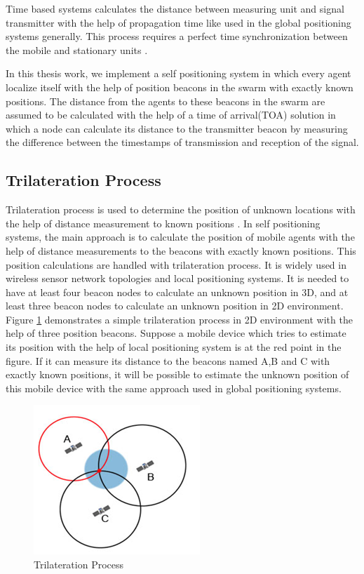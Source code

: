 Time based systems calculates the distance between measuring unit and signal transmitter with the help of propagation time like used in the global positioning systems generally. This process requires a perfect time synchronization between the mobile and stationary units \cite{20}.

In this thesis work, we implement a self positioning system in which every agent localize itself with the help of position beacons in the swarm with exactly known positions. The distance from the agents to these beacons in the swarm are assumed to be calculated with the help of a time of arrival(TOA) solution in which a node can calculate its distance to the transmitter beacon by measuring the difference between the timestamps of transmission and reception of the signal. 


\subsection{Trilateration Process} \label{Trilateration_Process_ref}

Trilateration process is used to determine the position of unknown locations with the help of distance measurement to known positions \cite{22}. In self positioning systems, the main approach is to calculate the position of mobile agents with the help of distance measurements to the beacons with exactly known positions. This position calculations are handled with trilateration process. It is widely used in wireless sensor network topologies and local positioning systems.  It is needed to have at least four beacon nodes to calculate an unknown position in 3D, and at least three beacon nodes to calculate an unknown position in 2D environment. Figure \ref{trilateration_ref} demonstrates a simple trilateration process in 2D environment with the help of  three position beacons. Suppose a mobile device which tries to estimate its position with the help of local positioning system is at the red point in the figure. If it can measure its distance to the beacons named A,B and C with exactly known positions, it will be possible to estimate the unknown position of this mobile device with the same approach used in global positioning systems. 


\begin{figure}[H]
	\caption{Trilateration Process \cite{101}} \label{trilateration_ref}
	\centering
	\includegraphics[scale = 1]{trilateration}
\end{figure}

